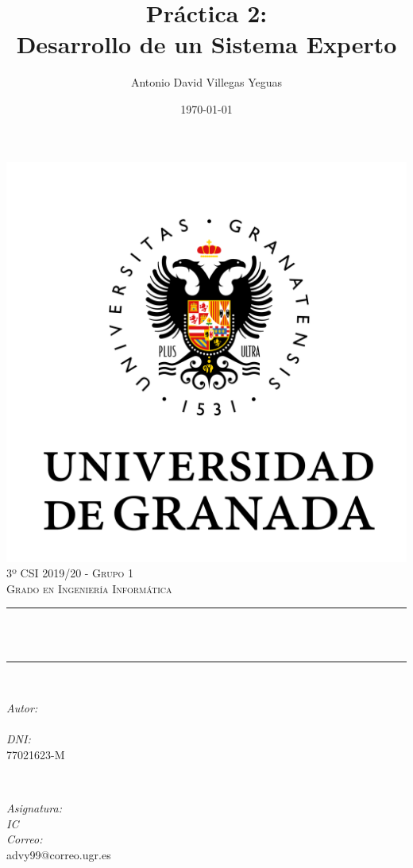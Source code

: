 \documentclass[12pt, spanish]{article}
\title{Práctica 2:\\
Desarrollo de un Sistema Experto  \hspace{0.05cm} }
\author{Antonio David Villegas Yeguas}
\date{\today}
\makeatletter
\let\thetitle\@title
\let\theauthor\@author
\makeatother
\begin{document}

\begin{titlepage}
    \centering
    \vspace*{0.3 cm}
    \includegraphics[scale = 0.50]{ugr.png}\\[0.7 cm]
    \textsc{\large 3º CSI 2019/20 - Grupo 1}\\[0.5 cm]            
    \textsc{\large Grado en Ingeniería Informática}\\[0.5 cm]              
    \rule{\linewidth}{0.2 mm} \\[0.2 cm]
    { \huge \bfseries \thetitle}\\
    \rule{\linewidth}{0.2 mm} \\[1 cm]
    
    \begin{minipage}{0.4\textwidth}
        \begin{flushleft} \large
            \emph{Autor:}\\
            \theauthor\\ 
			 \emph{DNI:}\\
            77021623-M
            \end{flushleft}
            \end{minipage}~
            \begin{minipage}{0.4\textwidth}
            \begin{flushright} \large
            \emph{Asignatura: \\
            IC}   \\     
            \emph{Correo:}\\
            advy99@correo.ugr.es           
        \end{flushright}
    \end{minipage}\\[0.5cm]
  

\end{titlepage}
\end{document}
